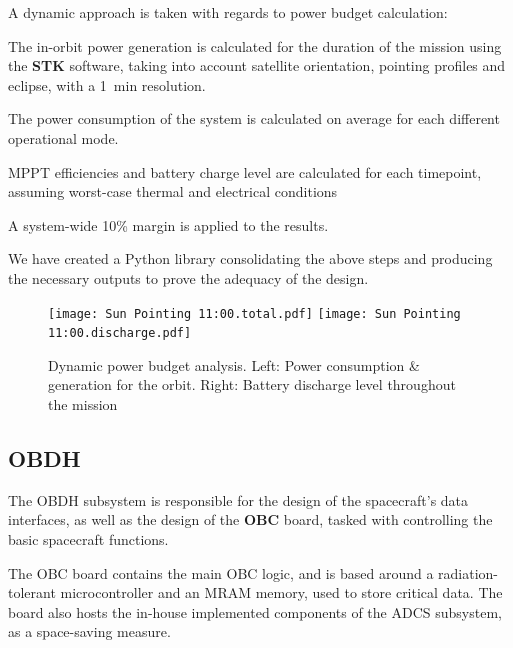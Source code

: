 \documentclass[a4paper,nobib]{tufte-book}
\begin{document}
\FloatBarrier
A dynamic approach is taken with regards to power budget calculation:
\begin{compactenum}
	\item The in-orbit power generation is calculated for the duration of the mission using the \textbf{STK} software, taking into account satellite orientation, pointing profiles and eclipse, with a \SI{1}{\minute} resolution.
	\item The power consumption of the system is calculated on average for each different operational mode.
	\item \acs{MPPT} efficiencies and battery charge level are calculated for each timepoint, assuming worst-case thermal and electrical conditions
	\item A system-wide 10\% margin is applied to the results.
\end{compactenum}

We have created a Python library consolidating the above steps and producing the necessary outputs to prove the adequacy of the design.

\begin{figure}[h]
	\texttt{[image: Sun Pointing 11:00.total.pdf]}
	\hfill
	\texttt{[image: Sun Pointing 11:00.discharge.pdf]}

	\caption[Dynamic power budget analysis]{Dynamic power budget analysis. Left: Power consumption \& generation for the orbit. Right: Battery discharge level throughout the mission}
\end{figure}

\subsection{\acf{OBDH}}
\label{sec:obdh}

The \ac{OBDH} subsystem is responsible for the design of the spacecraft's data interfaces, as well as the design of the \textbf{\acf{OBC}} board, tasked with controlling the basic spacecraft functions.\autocite{DDJF_OBDH}

The \ac{OBC} board contains the main \ac{OBC} logic, and is based around a  radiation-tolerant microcontroller and an \acs{MRAM} memory, used to store critical data. The board also hosts the in-house implemented components of the \ac{ADCS} subsystem, as a space-saving measure.
\end{document}
